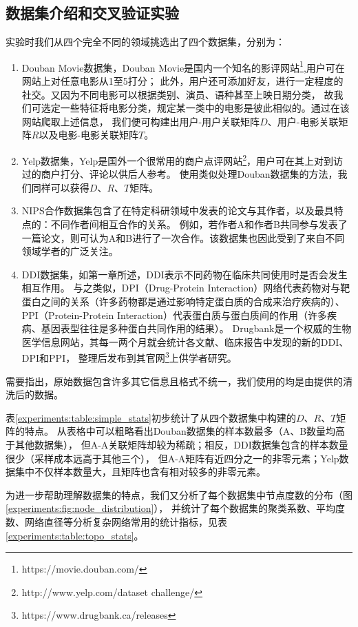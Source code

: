 \subsection{数据集介绍和交叉验证实验}
\label{experiments:sec:db_cv}
实验时我们从四个完全不同的领域挑选出了四个数据集，分别为：
\begin{enumerate}
    \item Douban Movie数据集，Douban Movie是国内一个知名的影评网站\footnote{https://movie.douban.com/},用户可在网站上对任意电影从1至5打分；
    此外，用户还可添加好友，进行一定程度的社交。又因为不同电影可以根据类别、演员、语种甚至上映日期分类，
    故我们可选定一些特征将电影分类，规定某一类中的电影是彼此相似的。通过在该网站爬取上述信息，
    我们便可构建出用户-用户关联矩阵$D$、用户-电影关联矩阵$R$以及电影-电影关联矩阵$T$。
    \item Yelp数据集，Yelp是国外一个很常用的商户点评网站\footnote{http://www.yelp.com/dataset challenge/}，用户可在其上对到访过的商户打分、评论以供后人参考。
    使用类似处理Douban数据集的方法，我们同样可以获得$D$、$R$、$T$矩阵。
    \item NIPS合作数据集包含了在特定科研领域中发表的论文与其作者，以及最具特点的：不同作者间相互合作的关系。
    例如，若作者A和作者B共同参与发表了一篇论文，则可认为A和B进行了一次合作。该数据集也因此受到了来自不同领域学者的广泛关注。
    \item DDI数据集，如第一章所述，DDI表示不同药物在临床共同使用时是否会发生相互作用。
    与之类似，DPI（Drug-Protein Interaction）网络代表药物对与靶蛋白之间的关系（许多药物都是通过影响特定蛋白质的合成来治疗疾病的）、
    PPI（Protein-Protein Interaction）代表蛋白质与蛋白质间的作用（许多疾病、基因表型往往是多种蛋白共同作用的结果）。
    Drugbank是一个权威的生物医学信息网站，其每一两个月就会统计各文献、临床报告中发现的新的DDI、DPI和PPI，
    整理后发布到其官网\footnote{https://www.drugbank.ca/releases}上供学者研究。
\end{enumerate}


需要指出，原始数据包含许多其它信息且格式不统一，我们使用的均是由\cite{zhang2018prioritizing}提供的清洗后的数据。


表\ref{experiments:table:simple_stats}初步统计了从四个数据集中构建的$D$、$R$、$T$矩阵的特点。
从表格中可以粗略看出Douban数据集的样本数最多（A、B数量均高于其他数据集），
但A-A关联矩阵却较为稀疏；相反，DDI数据集包含的样本数量很少（采样成本远高于其他三个），
但A-A矩阵有近四分之一的非零元素；Yelp数据集中不仅样本数量大，且矩阵也含有相对较多的非零元素。


为进一步帮助理解数据集的特点，我们又分析了每个数据集中节点度数的分布（图\ref{experiments:fig:node_distribution}），
并统计了每个数据集的聚类系数、平均度数、网络直径等分析复杂网络常用的统计指标，见表\ref{experiments:table:topo_stats}。


